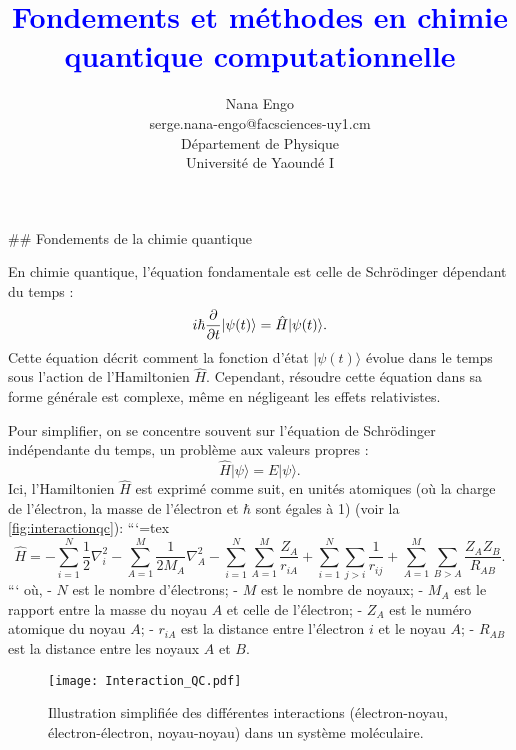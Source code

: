 \documentclass[12pt,a4paper]{report}
\title{\textcolor{blue}{Fondements et méthodes en chimie quantique computationnelle}}
\author{Nana Engo\\serge.nana-engo@facsciences-uy1.cm\\
Département de Physique\\ Université de Yaoundé I}
\date{
    \vspace{8cm} %
    \begin{center}
        \begin{minipage}{0.3\textwidth}
        \centering
            \texttt{[image: Neo\_Logo.jpg]}
        \end{minipage}
        \hfill
        \begin{minipage}{0.3\textwidth}
        \centering
        Novembre 2024
        \end{minipage}
        \hfill %
        \begin{minipage}{0.3\textwidth}
        \centering
            \texttt{[image: UY1\_Logo]}
        \end{minipage}
    \end{center}
}
\numberwithin{equation}{section}
\numberwithin{figure}{section}
\numberwithin{table}{section}
\begin{document}
\pagestyle{logo}

\renewcommand{\arraystretch}{1.2}

\maketitle\begin{markdown}


## Fondements de la chimie quantique

En chimie quantique, l'équation fondamentale est celle de Schrödinger dépendant du temps :
\begin{equation}
i\hbar \pdv{t} |\psi(t)\rangle = \hat{H} |\psi(t)\rangle .
\end{equation}
Cette équation décrit comment la fonction d'état $|\psi(t)\rangle$ évolue dans le temps sous l'action de l'Hamiltonien $\hat{H}$. Cependant, résoudre cette équation dans sa forme générale est complexe, même en négligeant les effets relativistes.

Pour simplifier, on se concentre souvent sur l'équation de Schrödinger indépendante du temps, un problème aux valeurs propres :
\begin{equation}
\hat{H} |\psi\rangle = E |\psi\rangle .
\end{equation}
Ici, l’Hamiltonien $\hat{H}$ est exprimé comme suit, en unités atomiques (où la charge de l'électron, la masse de l'électron et $\hbar$ sont égales à 1) (voir la \autoref{fig:interactionqc}):
```{=tex}
\begin{equation}
\hat{H} = -\sum_{i=1}^N \frac12 \nabla_i^2 - \sum_{A=1}^M \frac{1}{2M_A} \nabla_A^2 - \sum_{i=1}^N \sum_{A=1}^M \frac{Z_A}{r_{iA}} + \sum_{i=1}^N \sum_{j>i} \frac{1}{r_{ij}} + \sum_{A=1}^M \sum_{B>A} \frac{Z_A Z_B}{R_{AB}} .
\end{equation}
```
où,
- $N$ est le nombre d'électrons;
- $M$ est le nombre de noyaux;
- $M_A$ est le rapport entre la masse du noyau $A$ et celle de l'électron;
- $Z_A$ est le numéro atomique du noyau $A$;
- $r_{iA}$ est la distance entre l’électron $i$ et le noyau $A$;
- $R_{AB}$ est la distance entre les noyaux $A$ et $B$.

\begin{figure}[tbph]
\centering
\texttt{[image: Interaction\_QC.pdf]}
\caption{Illustration simplifiée des différentes interactions (électron-noyau, électron-électron, noyau-noyau) dans un système moléculaire.}
\label{fig:interactionqc}
\end{figure}


\end{markdown}
\end{document}
